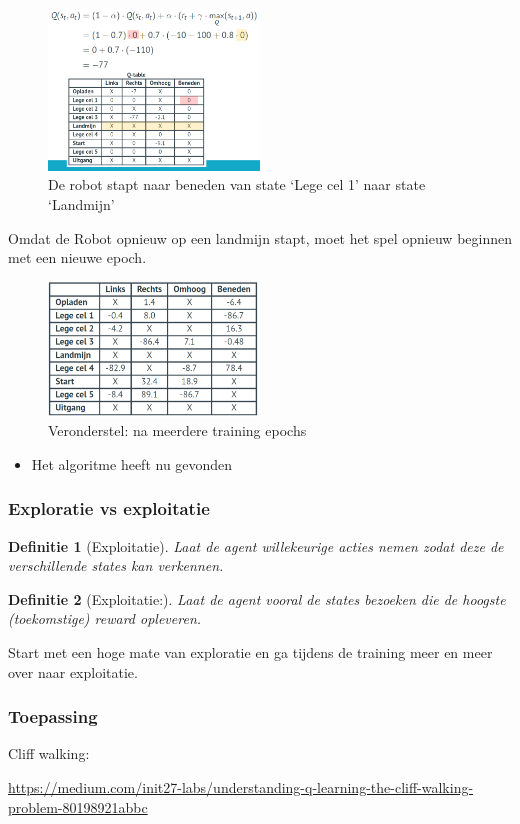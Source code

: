 \documentclass{article}
\newtheorem{theorem}{Definitie}[section]
\begin{document}
\begin{figure}[H]
    \centering
    \includegraphics[width=0.5\textwidth]{q-table8.png}
    \caption{De robot stapt naar beneden van state `Lege cel 1' naar state `Landmijn'}
\end{figure}

Omdat de Robot opnieuw op een landmijn stapt, moet het spel opnieuw beginnen met een nieuwe epoch.

\begin{figure}[H]
    \centering
    \includegraphics[width=0.5\textwidth]{q-table-epochx.png}
    \caption{Veronderstel: na meerdere training epochs}
\end{figure}

\begin{itemize}
    \item Het algoritme heeft nu gevonden 
\end{itemize}

\subsubsection{Exploratie vs exploitatie}

\begin{theorem}[Exploitatie]
    Laat de agent willekeurige acties nemen zodat deze de verschillende states kan verkennen.
\end{theorem}

\begin{theorem}[Exploitatie:]
    Laat de agent vooral de states bezoeken die de hoogste (toekomstige) reward opleveren.
\end{theorem}

Start met een hoge mate van exploratie en ga tijdens de training meer
en meer over naar exploitatie.

\subsubsection{Toepassing}

Cliff walking:

\url{https://medium.com/init27-labs/understanding-q-learning-the-cliff-walking-problem-80198921abbc}
\end{document}
